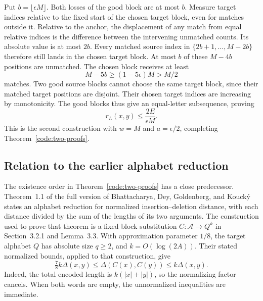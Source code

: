Put $b=\lfloor\epsilon M\rfloor$. Both losses of the good block are at
most $b$. Measure target indices relative to the fixed start of the chosen
target block, even for matches outside it. Relative to the anchor, the
displacement of any match from equal relative indices is the difference
between the intervening unmatched counts. Its absolute value is at most
$2b$. Every matched source index in
$\{2b+1,\ldots,M-2b\}$ therefore still lands in the chosen target block.
At most $b$ of these $M-4b$ positions are unmatched. The chosen block
receives at least
\[
 M-5b\geq(1-5\epsilon)M>M/2
\]
matches. Two good source blocks cannot choose the same target block, since
their matched target positions are disjoint. Their chosen target indices
are increasing by monotonicity. The good blocks thus give an equal-letter
subsequence, proving
\[
 r_L(x,y)\leq\frac{2E}{\epsilon M}.
\]
This is the second construction with $w=M$ and $a=\epsilon/2$, completing
Theorem~\ref{code:two-proofs}.

\subsection{Relation to the earlier alphabet reduction}
The existence order in Theorem~\ref{code:two-proofs} has a close predecessor.
Theorem~1.1 of the full version of Bhattacharya, Dey, Goldenberg, and Kouck\'y
\cite{BhattacharyaDeyGoldenbergKoucky2024} states an alphabet reduction for
normalized insertion--deletion distance, with each distance divided by the
sum of the lengths of its two arguments.
The construction used to prove that theorem is a fixed block substitution
$C:\mathcal A\to Q^k$ in Section~3.2.1 and Lemma~3.3. With approximation
parameter $1/8$, the target alphabet $Q$ has absolute size $q\geq2$, and
$k=O(\log(2A))$. Their stated normalized bounds, applied to that
construction, give
\begin{equation}\label{code:prior-indel}
 \tfrac78 k\Delta(x,y)\leq\Delta(C(x),C(y))\leq k\Delta(x,y).
\end{equation}
Indeed, the total encoded length is $k(|x|+|y|)$, so the normalizing factor
cancels. When both words are empty, the unnormalized inequalities are
immediate.

